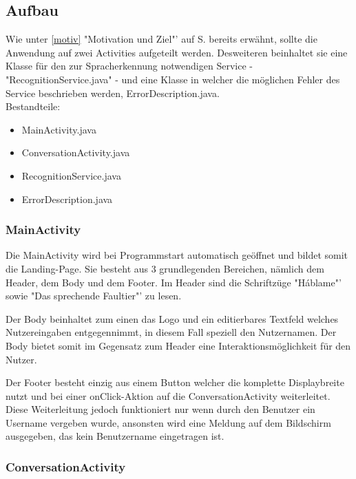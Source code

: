 	\subsection{Aufbau}\label{aufbau}

	Wie unter \ref{motiv} "Motivation und Ziel"' auf S.\pageref{motiv} bereits erwähnt, sollte die Anwendung auf zwei Activities aufgeteilt werden. Desweiteren beinhaltet sie eine Klasse für den zur Spracherkennung notwendigen Service - "RecognitionService.java" - und eine Klasse in welcher die möglichen Fehler des Service beschrieben werden, ErrorDescription.java. \\
	
	Bestandteile:
	\begin{itemize}
		\item MainActivity.java
		\item ConversationActivity.java
		\item RecognitionService.java
		\item ErrorDescription.java
	\end{itemize}
	
		\subsubsection{MainActivity}\label{mainact}
		Die MainActivity wird bei Programmstart automatisch geöffnet und bildet somit die Landing-Page. Sie besteht aus 3 grundlegenden Bereichen, nämlich dem Header, dem Body und dem Footer. Im Header sind die Schriftzüge "Háblame"' sowie "Das sprechende Faultier"' zu lesen.
		
		Der Body beinhaltet zum einen das Logo und ein editierbares Textfeld welches Nutzereingaben entgegennimmt, in diesem Fall speziell den Nutzernamen. Der Body bietet somit im Gegensatz zum Header eine Interaktionsmöglichkeit für den Nutzer.
		
		Der Footer besteht einzig aus einem Button welcher die komplette Displaybreite nutzt und bei einer onClick-Aktion auf die ConversationActivity weiterleitet. Diese Weiterleitung jedoch funktioniert nur wenn durch den Benutzer ein Username vergeben wurde, ansonsten wird eine Meldung auf dem Bildschirm ausgegeben, das kein Benutzername eingetragen ist. \\

		\subsubsection{ConversationActivity}\label{convact}
		
